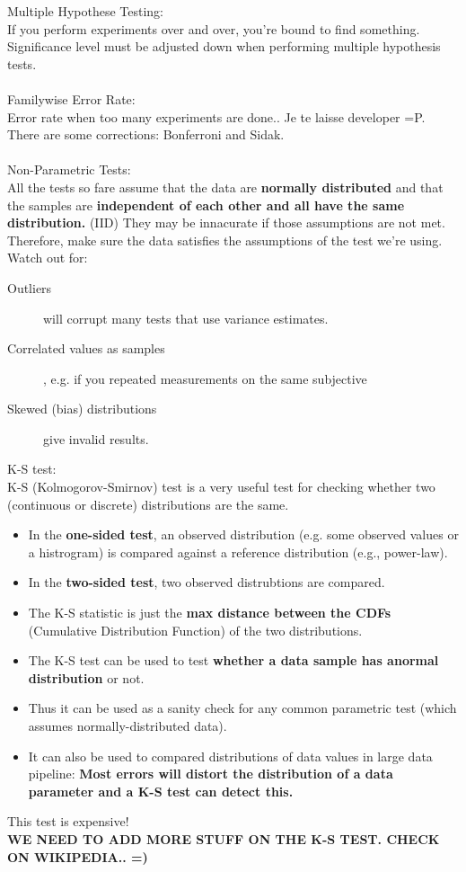 \documentclass[a4paper,11pt,twoside]{article}
\begin{document}
Multiple Hypothese Testing: \\
If you perform experiments over and over, you're bound to find something. Significance level must be adjusted down when performing multiple hypothesis tests. 
\\\\
Familywise Error Rate: \\
Error rate when too many experiments are done.. Je te laisse developer =P. There are some corrections: Bonferroni and Sidak.
\\\\
Non-Parametric Tests: \\
All the tests so fare assume that the data are {\bf normally distributed} and that the samples are {\bf independent of each other and all have the same distribution.} (IID) They may be innacurate if those assumptions are not met. Therefore, make sure the data satisfies the assumptions of the test we're using. Watch out for:
\begin{description}
 \item[Outliers] will corrupt many tests that use variance estimates.
 \item[Correlated values as samples], e.g. if you repeated measurements on the same subjective
 \item[Skewed (bias) distributions] give invalid results.
\end{description}
K-S test: \\
K-S (Kolmogorov-Smirnov) test is a very useful test for checking whether two (continuous or discrete) distributions are the same. 
\begin{itemize}
 \item In the {\bf one-sided test}, an observed distribution (e.g. some observed values or a histrogram) is compared against a reference distribution (e.g., power-law).
 \item In the {\bf two-sided test}, two observed distrubtions are compared.
 \item The K-S statistic is just the {\bf max distance between the CDFs} (Cumulative Distribution Function) of the two distributions.
 \item The K-S test can be used to test {\bf whether a data sample has  anormal distribution} or not.
 \item Thus it can be used as a sanity check for any common parametric test (which assumes normally-distributed data).
 \item It can also be used to compared distributions of data values in large data pipeline: {\bf Most errors will distort the distribution of a data parameter and a K-S test can detect this.}
\end{itemize}
This test is expensive! 
\\
{\bf WE NEED TO ADD MORE STUFF ON THE K-S TEST. CHECK ON WIKIPEDIA.. =) }
   
\end{document}
